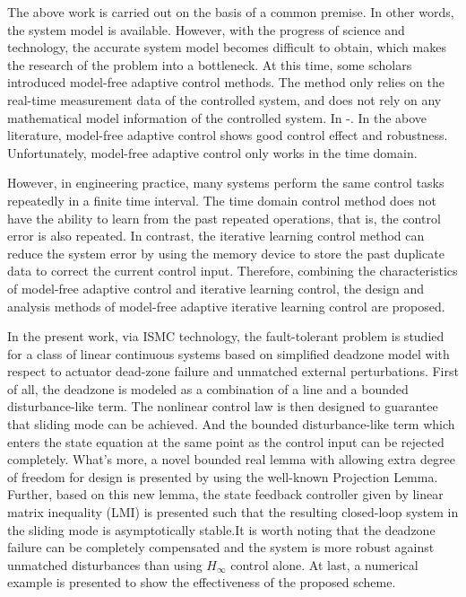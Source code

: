 \documentclass[journal,onecolumn]{IEEEtran}
\begin{document}
The above work is carried out on the basis of a common premise. In other words, the system model is available. However, with the progress of science and technology, the accurate system model becomes difficult to obtain, which makes the research of the problem into a bottleneck. At this time, some scholars introduced model-free adaptive control methods. The method only relies on the real-time measurement data of the controlled system, and does not rely on any mathematical model information of the controlled system. In \cite{10}-\cite{12}. In the above literature, model-free adaptive control shows good control effect and robustness. Unfortunately, model-free adaptive control only works in the time domain.

However, in engineering practice, many systems perform the same control tasks repeatedly in a finite time interval. The time domain control method does not have the ability to learn from the past repeated operations, that is, the control error is also repeated. In contrast, the iterative learning control method can reduce the system error by using the memory device to store the past duplicate data to correct the current control input. Therefore, combining the characteristics of model-free adaptive control and iterative learning control, the design and analysis methods of model-free adaptive iterative learning control are proposed.


In the present work, via ISMC technology, the fault-tolerant problem
is studied for a class of linear continuous systems based on
simplified deadzone model with respect to actuator dead-zone failure
and unmatched external perturbations. First of all, the deadzone is
modeled as a combination of a line and a bounded disturbance-like
term. The nonlinear control law is then designed to guarantee that
sliding mode can be achieved. And the bounded disturbance-like term
which enters the state equation at the same point as the control
input can be rejected completely. What's more, a novel bounded real
lemma with allowing extra degree of freedom for design is presented
by using the well-known Projection Lemma. Further, based on this new
lemma, the state feedback controller given by linear matrix
inequality (LMI) is presented such that the resulting closed-loop
system in the sliding mode is asymptotically stable.It is worth
noting that the deadzone failure can be completely compensated and
the system is more robust against unmatched disturbances than using
$H_\infty$ control alone. At last, a numerical example is presented
to show the effectiveness of the proposed scheme.
\end{document}
